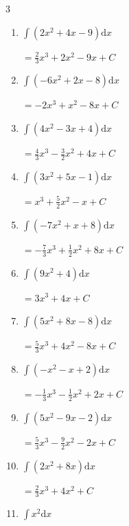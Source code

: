\begin{multicols}{3}
\begin{enumerate}
  \item $\displaystyle \int \left( 2x^{2}+4x-9 \right) \mathrm{d}x$

        $\displaystyle =\frac{2}{3}x^{3}+2x^{2}-9x+ C$

  \item $\displaystyle \int \left( -6x^{2}+2x-8 \right) \mathrm{d}x$

        $\displaystyle =-2x^{3}+x^{2}-8x+ C$

  \item $\displaystyle \int \left( 4x^{2}-3x+4 \right) \mathrm{d}x$

        $\displaystyle =\frac{4}{3}x^{3}-\frac{3}{2}x^{2}+4x+ C$

  \item $\displaystyle \int \left( 3x^{2}+5x-1 \right) \mathrm{d}x$

        $\displaystyle =x^{3}+\frac{5}{2}x^{2}-x+ C$

  \item $\displaystyle \int \left( -7x^{2}+x+8 \right) \mathrm{d}x$

        $\displaystyle =-\frac{7}{3}x^{3}+\frac{1}{2}x^{2}+8x+ C$

  \item $\displaystyle \int \left( 9x^{2}+4 \right) \mathrm{d}x$

        $\displaystyle =3x^{3}+4x+ C$

  \item $\displaystyle \int \left( 5x^{2}+8x-8 \right) \mathrm{d}x$

        $\displaystyle =\frac{5}{3}x^{3}+4x^{2}-8x+ C$

  \item $\displaystyle \int \left( -x^{2}-x+2 \right) \mathrm{d}x$

        $\displaystyle =-\frac{1}{3}x^{3}-\frac{1}{2}x^{2}+2x+ C$

\columnbreak %

  \item $\displaystyle \int \left( 5x^{2}-9x-2 \right) \mathrm{d}x$

        $\displaystyle =\frac{5}{3}x^{3}-\frac{9}{2}x^{2}-2x+ C$

  \item $\displaystyle \int \left( 2x^{2}+8x \right) \mathrm{d}x$

        $\displaystyle =\frac{2}{3}x^{3}+4x^{2}+ C$

  \item $\displaystyle \int x^{2} \mathrm{d}x$


\end{enumerate}
\end{multicols}
